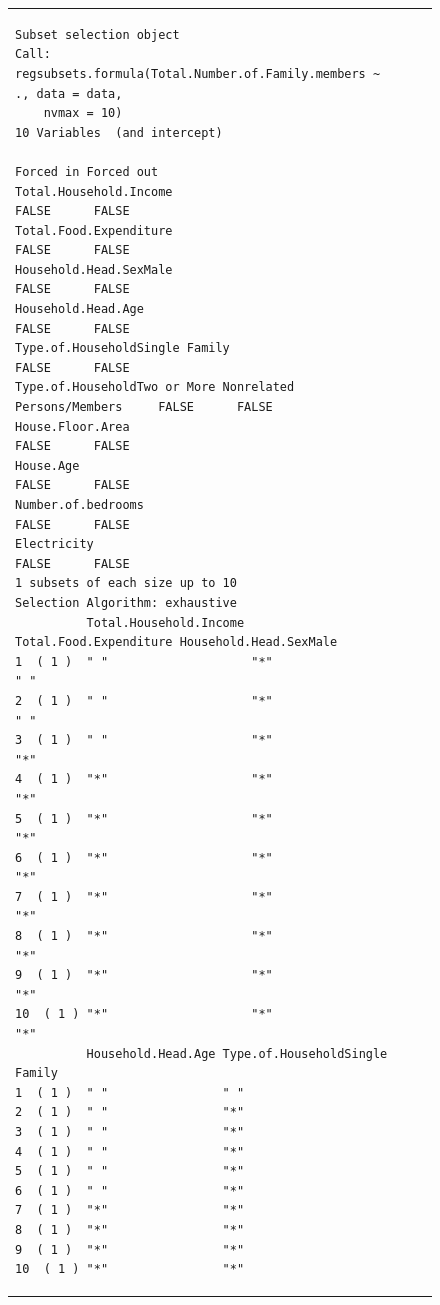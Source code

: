 \documentclass[
]{article}
\begin{document}
\begin{figure}[H]
\begin{table}[H]
\begin{tabular}[t]{lrr}
\begin{verbatim}
Subset selection object
Call: regsubsets.formula(Total.Number.of.Family.members ~ ., data = data, 
    nvmax = 10)
10 Variables  (and intercept)
                                                        Forced in Forced out
Total.Household.Income                                      FALSE      FALSE
Total.Food.Expenditure                                      FALSE      FALSE
Household.Head.SexMale                                      FALSE      FALSE
Household.Head.Age                                          FALSE      FALSE
Type.of.HouseholdSingle Family                              FALSE      FALSE
Type.of.HouseholdTwo or More Nonrelated Persons/Members     FALSE      FALSE
House.Floor.Area                                            FALSE      FALSE
House.Age                                                   FALSE      FALSE
Number.of.bedrooms                                          FALSE      FALSE
Electricity                                                 FALSE      FALSE
1 subsets of each size up to 10
Selection Algorithm: exhaustive
          Total.Household.Income Total.Food.Expenditure Household.Head.SexMale
1  ( 1 )  " "                    "*"                    " "                   
2  ( 1 )  " "                    "*"                    " "                   
3  ( 1 )  " "                    "*"                    "*"                   
4  ( 1 )  "*"                    "*"                    "*"                   
5  ( 1 )  "*"                    "*"                    "*"                   
6  ( 1 )  "*"                    "*"                    "*"                   
7  ( 1 )  "*"                    "*"                    "*"                   
8  ( 1 )  "*"                    "*"                    "*"                   
9  ( 1 )  "*"                    "*"                    "*"                   
10  ( 1 ) "*"                    "*"                    "*"                   
          Household.Head.Age Type.of.HouseholdSingle Family
1  ( 1 )  " "                " "                           
2  ( 1 )  " "                "*"                           
3  ( 1 )  " "                "*"                           
4  ( 1 )  " "                "*"                           
5  ( 1 )  " "                "*"                           
6  ( 1 )  " "                "*"                           
7  ( 1 )  "*"                "*"                           
8  ( 1 )  "*"                "*"                           
9  ( 1 )  "*"                "*"                           
10  ( 1 ) "*"                "*"                           

\end{verbatim}
\end{tabular}
\end{table}
\end{figure}
\end{document}
